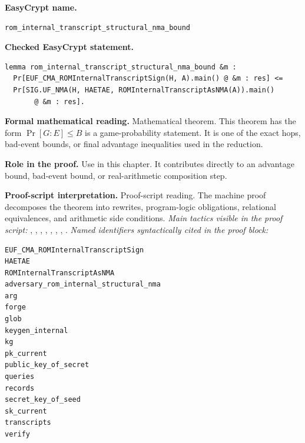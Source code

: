 \begin{formaltheorem}
\noindent\textbf{EasyCrypt name.}
\begin{lstlisting}[language=EasyCrypt,basicstyle=\ttfamily\scriptsize]
rom_internal_transcript_structural_nma_bound
\end{lstlisting}
\noindent\textbf{Checked EasyCrypt statement.}
\begin{lstlisting}[language=EasyCrypt,basicstyle=\ttfamily\scriptsize]
lemma rom_internal_transcript_structural_nma_bound &m :
  Pr[EUF_CMA_ROMInternalTranscriptSign(H, A).main() @ &m : res] <=
  Pr[SIG.UF_NMA(H, HAETAE, ROMInternalTranscriptAsNMA(A)).main()
       @ &m : res].
\end{lstlisting}
\noindent\textbf{Formal mathematical reading.}
Mathematical theorem. This theorem has the form \(\Pr[G:E] \le B\) is a game-probability statement.  It is one of the exact hops, bad-event bounds, or final advantage inequalities used in the reduction.

\noindent\textbf{Role in the proof.}
Use in this chapter. It contributes directly to an advantage bound, bad-event bound, or real-arithmetic composition step.

\noindent\textbf{Proof-script interpretation.}
Proof-script reading. The machine proof decomposes the theorem into rewrites, program-logic obligations, relational equivalences, and arithmetic side conditions.
\emph{Main tactics visible in the proof script:} , , , , , , , .
\emph{Named identifiers syntactically cited in the proof block:}
\begin{lstlisting}[language=EasyCrypt,basicstyle=\ttfamily\scriptsize]
EUF_CMA_ROMInternalTranscriptSign
HAETAE
ROMInternalTranscriptAsNMA
adversary_rom_internal_structural_nma
arg
forge
glob
keygen_internal
kg
pk_current
public_key_of_secret
queries
records
secret_key_of_seed
sk_current
transcripts
verify
\end{lstlisting}

\end{formaltheorem}

